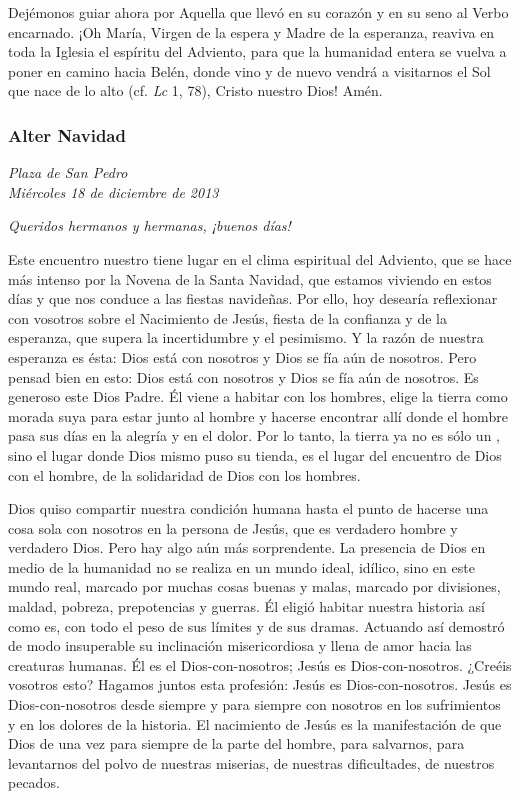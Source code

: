 Dejémonos guiar ahora por Aquella que llevó en su corazón y en su seno al Verbo encarnado. ¡Oh María, Virgen de la espera y Madre de la esperanza, reaviva en toda la Iglesia el espíritu del Adviento, para que la humanidad entera se vuelva a poner en camino hacia Belén, donde vino y de nuevo vendrá a visitarnos el Sol que nace de lo alto (cf. \emph{Lc} 1, 78), Cristo nuestro Dios! Amén.

\subsubsection{Alter Navidad} \emph{Plaza de San Pedro}\\ \emph{Miércoles 18 de diciembre de 2013}


 

\emph{Queridos hermanos y hermanas, ¡buenos días!}

Este encuentro nuestro tiene lugar en el clima espiritual del Adviento, que se hace más intenso por la Novena de la Santa Navidad, que estamos viviendo en estos días y que nos conduce a las fiestas navideñas. Por ello, hoy desearía reflexionar con vosotros sobre el Nacimiento de Jesús, fiesta de la confianza y de la esperanza, que supera la incertidumbre y el pesimismo. Y la razón de nuestra esperanza es ésta: Dios está con nosotros y Dios se fía aún de nosotros. Pero pensad bien en esto: Dios está con nosotros y Dios se fía aún de nosotros. Es generoso este Dios Padre. Él viene a habitar con los hombres, elige la tierra como morada suya para estar junto al hombre y hacerse encontrar allí donde el hombre pasa sus días en la alegría y en el dolor. Por lo tanto, la tierra ya no es sólo un , sino el lugar donde Dios mismo puso su tienda, es el lugar del encuentro de Dios con el hombre, de la solidaridad de Dios con los hombres.

Dios quiso compartir nuestra condición humana hasta el punto de hacerse una cosa sola con nosotros en la persona de Jesús, que es verdadero hombre y verdadero Dios. Pero hay algo aún más sorprendente. La presencia de Dios en medio de la humanidad no se realiza en un mundo ideal, idílico, sino en este mundo real, marcado por muchas cosas buenas y malas, marcado por divisiones, maldad, pobreza, prepotencias y guerras. Él eligió habitar nuestra historia así como es, con todo el peso de sus límites y de sus dramas. Actuando así demostró de modo insuperable su inclinación misericordiosa y llena de amor hacia las creaturas humanas. Él es el Dios-con-nosotros; Jesús es Dios-con-nosotros. ¿Creéis vosotros esto? Hagamos juntos esta profesión: Jesús es Dios-con-nosotros. Jesús es Dios-con-nosotros desde siempre y para siempre con nosotros en los sufrimientos y en los dolores de la historia. El nacimiento de Jesús es la manifestación de que Dios  de una vez para siempre de la parte del hombre, para salvarnos, para levantarnos del polvo de nuestras miserias, de nuestras dificultades, de nuestros pecados.

